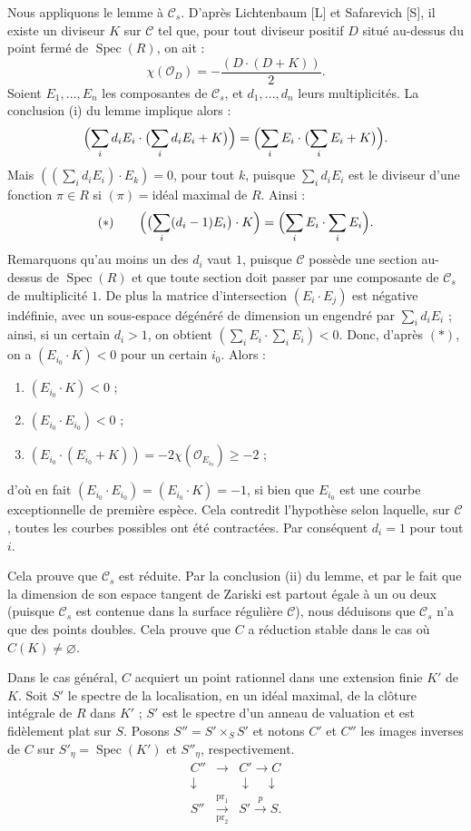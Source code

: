 \documentclass[10pt]{article}
\newcommand{\Spec}{\operatorname{Spec}}
\newcommand{\cO}{\mathcal O}
\begin{document}
Nous appliquons le lemme à $\mathscr C_s$. D'après Lichtenbaum [L] et Safarevich [S], il existe un diviseur $K$ sur $\mathscr C$ tel que, pour tout diviseur positif $D$ situé au-dessus du point fermé de $\Spec(R)$, on ait :
\[
\chi(\cO_D)=-\frac{(D\cdot(D+K))}{2}.
\]
Soient $E_1,\ldots,E_n$ les composantes de $\mathscr C_s$, et $d_1,\ldots,d_n$ leurs multiplicités. La conclusion (i) du lemme implique alors :
\[
\Bigl(\sum_i d_iE_i\cdot\bigl(\sum_i d_iE_i+K\bigr)\Bigr)=
\Bigl(\sum_i E_i\cdot\bigl(\sum_i E_i+K\bigr)\Bigr).
\]
Mais $((\sum_i d_iE_i)\cdot E_k)=0$, pour tout $k$, puisque $\sum_i d_iE_i$ est le diviseur d'une fonction $\pi\in R$ si $(\pi)={}$idéal maximal de $R$. Ainsi :
\[
(*)\qquad \Bigl(\bigl(\sum_i(d_i-1)E_i\bigr)\cdot K\Bigr)=\Bigl(\sum_i E_i\cdot\sum_i E_i\Bigr).
\]
Remarquons qu'au moins un des $d_i$ vaut $1$, puisque $\mathscr C$ possède une section au-dessus de $\Spec(R)$ et que toute section doit passer par une composante de $\mathscr C_s$ de multiplicité $1$. De plus la matrice d'intersection $(E_i\cdot E_j)$ est négative indéfinie, avec un sous-espace dégénéré de dimension un engendré par $\sum_i d_iE_i$ ; ainsi, si un certain $d_i>1$, on obtient $(\sum_i E_i\cdot\sum_i E_i)<0$. Donc, d'après $(*)$, on a $(E_{i_0}\cdot K)<0$ pour un certain $i_0$. Alors :
\begin{enumerate}[label=\emph{\alph*)}]
\item $(E_{i_0}\cdot K)<0$ ;
\item $(E_{i_0}\cdot E_{i_0})<0$ ;
\item $(E_{i_0}\cdot(E_{i_0}+K))=-2\chi(\cO_{E_{i_0}})\geq -2$ ;
\end{enumerate}
d'où en fait $(E_{i_0}\cdot E_{i_0})=(E_{i_0}\cdot K)=-1$, si bien que $E_{i_0}$ est une courbe exceptionnelle de première espèce. Cela contredit l'hypothèse selon laquelle, sur $\mathscr C$, toutes les courbes possibles ont été contractées. Par conséquent $d_i=1$ pour tout $i$.

Cela prouve que $\mathscr C_s$ est réduite. Par la conclusion (ii) du lemme, et par le fait que la dimension de son espace tangent de Zariski est partout égale à un ou deux (puisque $\mathscr C_s$ est contenue dans la surface régulière $\mathscr C$), nous déduisons que $\mathscr C_s$ n'a que des points doubles. Cela prouve que $C$ a réduction stable dans le cas où $C(K)\ne\varnothing$.

Dans le cas général, $C$ acquiert un point rationnel dans une extension finie $K'$ de $K$. Soit $S'$ le spectre de la localisation, en un idéal maximal, de la clôture intégrale de $R$ dans $K'$ ; $S'$ est le spectre d'un anneau de valuation et est fidèlement plat sur $S$. Posons $S''=S'\times_S S'$ et notons $C'$ et $C''$ les images inverses de $C$ sur $S'_\eta=\Spec(K')$ et $S''_\eta$, respectivement.
\[
\begin{array}{ccc}
C''&\longrightarrow&C'\longrightarrow C\\[2pt]
\downarrow&&\downarrow\quad\downarrow\\[-1pt]
S''&\xrightarrow[\mathrm{pr}_2]{\mathrm{pr}_1}&S'\xrightarrow{\ p\ }S.
\end{array}
\]
\end{document}

